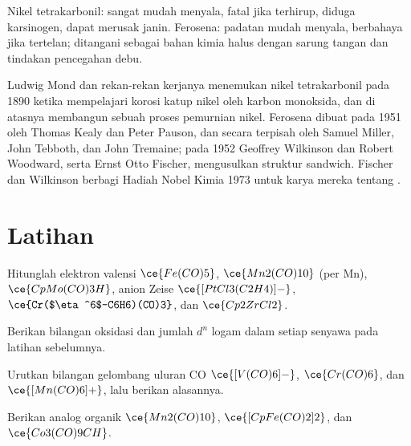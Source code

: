 \begin{safety}{}
Nikel tetrakarbonil: sangat mudah menyala, fatal jika terhirup, diduga karsinogen,
dapat merusak janin. Ferosena: padatan mudah menyala, berbahaya jika tertelan;
ditangani sebagai bahan kimia halus dengan sarung tangan dan tindakan pencegahan debu.
\end{safety}

\begin{history}
Ludwig Mond dan rekan-rekan kerjanya menemukan nikel tetrakarbonil pada 1890 ketika
mempelajari korosi katup nikel oleh karbon monoksida, dan di atasnya membangun
sebuah proses pemurnian nikel. Ferosena dibuat pada 1951 oleh Thomas Kealy dan Peter
Pauson, dan secara terpisah oleh Samuel Miller, John Tebboth, dan John Tremaine; pada 1952
Geoffrey Wilkinson dan Robert Woodward, serta Ernst Otto Fischer, mengusulkan
struktur sandwich. Fischer dan Wilkinson berbagi Hadiah Nobel Kimia 1973 untuk
karya mereka tentang .
\end{history}

\section{Latihan}

\begin{exercise}[$\star$]\label{exo:b3:organometallic-bonding:1}
Hitunglah elektron valensi $\ce{Fe(CO)5}$, $\ce{Mn2(CO)10}$ (per Mn), $\ce{CpMo(CO)3H}$, anion Zeise
$\ce{[PtCl3(C2H4)]-}$, $\ce{Cr($\eta^6$-C6H6)(CO)3}$, dan $\ce{Cp2ZrCl2}$.
\end{exercise}

\begin{exercise}[$\star$]\label{exo:b3:organometallic-bonding:2}
Berikan bilangan oksidasi dan jumlah $d^n$ logam dalam setiap senyawa pada
latihan sebelumnya.
\end{exercise}

\begin{exercise}[$\star$]\label{exo:b3:organometallic-bonding:3}
Urutkan bilangan gelombang uluran CO $\ce{[V(CO)6]-}$, $\ce{Cr(CO)6}$, dan $\ce{[Mn(CO)6]+}$, lalu berikan alasannya.
\end{exercise}

\begin{exercise}[$\star$]\label{exo:b3:organometallic-bonding:4}
Berikan analog  organik $\ce{Mn2(CO)10}$, $\ce{[CpFe(CO)2]2}$, dan $\ce{Co3(CO)9CH}$.
\end{exercise}

